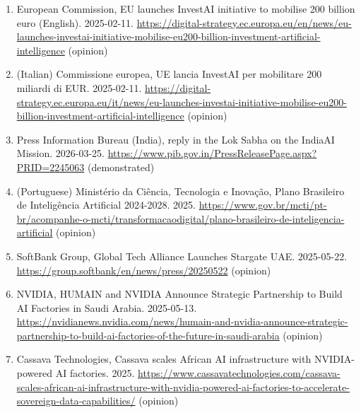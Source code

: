 \documentclass[10pt,letterpaper]{article}
\begin{document}
\begin{enumerate}
\item
  European Commission, EU launches InvestAI initiative to mobilise 200
  billion euro (English). 2025-02-11.
  \url{https://digital-strategy.ec.europa.eu/en/news/eu-launches-investai-initiative-mobilise-eu200-billion-investment-artificial-intelligence}
  (opinion)
\item
  (Italian) Commissione europea, UE lancia InvestAI per mobilitare 200
  miliardi di EUR. 2025-02-11.
  \url{https://digital-strategy.ec.europa.eu/it/news/eu-launches-investai-initiative-mobilise-eu200-billion-investment-artificial-intelligence}
  (opinion)
\item
  Press Information Bureau (India), reply in the Lok Sabha on the
  IndiaAI Mission. 2026-03-25.
  \url{https://www.pib.gov.in/PressReleasePage.aspx?PRID=2245063}
  (demonstrated)
\item
  (Portuguese) Ministério da Ciência, Tecnologia e Inovação, Plano
  Brasileiro de Inteligência Artificial 2024-2028. 2025.
  \url{https://www.gov.br/mcti/pt-br/acompanhe-o-mcti/transformacaodigital/plano-brasileiro-de-inteligencia-artificial}
  (opinion)
\item
  SoftBank Group, Global Tech Alliance Launches Stargate UAE.
  2025-05-22. \url{https://group.softbank/en/news/press/20250522}
  (opinion)
\item
  NVIDIA, HUMAIN and NVIDIA Announce Strategic Partnership to Build AI
  Factories in Saudi Arabia. 2025-05-13.
  \url{https://nvidianews.nvidia.com/news/humain-and-nvidia-announce-strategic-partnership-to-build-ai-factories-of-the-future-in-saudi-arabia}
  (opinion)
\item
  Cassava Technologies, Cassava scales African AI infrastructure with
  NVIDIA-powered AI factories. 2025.
  \url{https://www.cassavatechnologies.com/cassava-scales-african-ai-infrastructure-with-nvidia-powered-ai-factories-to-accelerate-sovereign-data-capabilities/}
  (opinion)
\end{enumerate}
\end{document}
